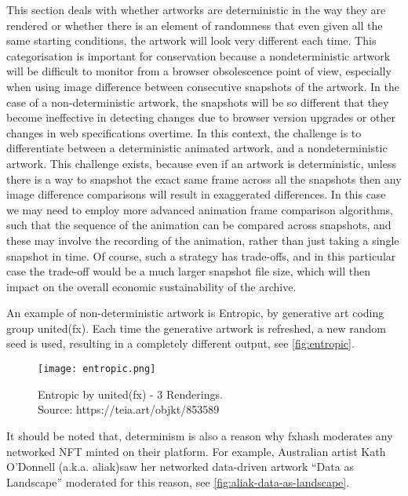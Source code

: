 This section deals with whether artworks are deterministic in the way they are rendered or whether there is an element of randomness that even given all the same starting conditions, the artwork will look very different each time. This categorisation is important for conservation because a nondeterministic artwork will be difficult to monitor from a browser obsolescence point of view, especially when using image difference between consecutive snapshots of the artwork. In the case of a non-deterministic artwork, the snapshots will be so different that they become ineffective in detecting changes due to browser version upgrades or other changes in web specifications overtime. In this context, the challenge is to differentiate between a deterministic animated artwork, and a nondeterministic artwork. This challenge exists, because even if an artwork is deterministic, unless there is a way to snapshot the exact same frame across all the snapshots then any image difference comparisons will result in exaggerated differences. In this case we may need to employ more advanced animation frame comparison algorithms, such that the sequence of the animation can be compared across snapshots, and these may involve the recording of the animation, rather than just taking a single snapshot in time. Of course, such a strategy has trade-offs, and in this particular case the trade-off would be a much larger snapshot file size, which will then impact on the overall economic sustainability of the archive.

An example of non-deterministic artwork is Entropic, by generative art coding group united(fx)\footnotemark[12]. Each time the generative artwork is refreshed, a new random seed is used, resulting in a completely different output, see \autoref{fig:entropic}.


\begin{figure}[h]
    \centering
    \captionsetup{justification=centering}
    \texttt{[image: entropic.png]}
    \captionsetup{justification=centering}
    \caption[Entropic by united(fx) - 3 Renderings]{Entropic by united(fx) - 3 Renderings. \\ Source: https://teia.art/objkt/853589}
    \label{fig:entropic}
\end{figure}


It should be noted that, determinism is also a reason why fxhash moderates any networked NFT minted on their platform. For example, Australian artist Kath O'Donnell (a.k.a. aliak)\footnotemark[13] saw her networked data-driven artwork ``Data as Landscape'' moderated for this reason, see \autoref{fig:aliak-data-as-landscape}.


